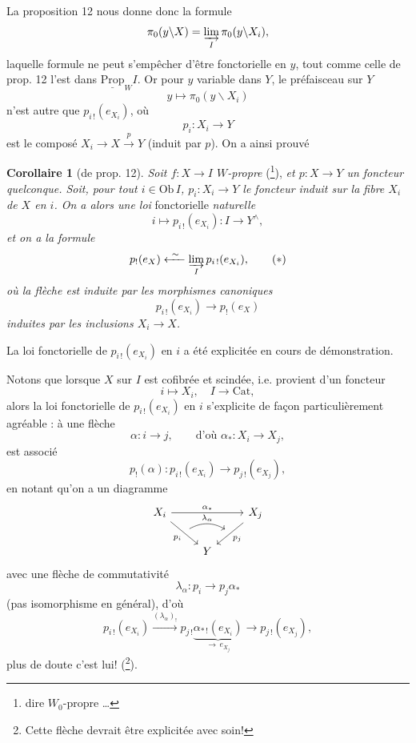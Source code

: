 \documentclass[11pt]{article}
\newcommand{\printedpage}[1]{\marginpar{\footnotesize p.~#1}}
\newcommand{\msp}[1]{\marginpar{\footnotesize [#1]}}
\begin{document}
\msp{page 118}
La proposition 12 nous donne donc la formule
\[
\pi_0(y\backslash X) = \varinjlim_{I} \pi_0(y\backslash X_i),
\]
laquelle formule ne peut s'empêcher d'être fonctorielle en $y$, tout comme celle de prop. 12 l'est dans $\underline{\mathrm{Prop}}_W I$. Or pour $y$ variable dans $Y$, le préfaisceau sur $Y$
\[
y \longmapsto \pi_0(y\backslash X_i)
\]
n'est autre que $p_{i\,!}(e_{X_i})$, où
\[
p_i : X_i \longrightarrow Y
\]
est le composé $X_i \longrightarrow X \xrightarrow{p} Y$ (induit par $p$). On a ainsi prouvé

\textbf{Corollaire 1} (de prop. 12). \textit{Soit $f : X \longrightarrow I$ $W$-propre} (\footnote[82]{dire $W_0$-propre \dots}), \textit{et $p : X \longrightarrow Y$ un foncteur quelconque. Soit, pour tout $i \in \mathrm{Ob}\, I$, $p_i : X_i \longrightarrow Y$ le foncteur induit sur la fibre $X_i$ de $X$ en $i$. On a alors une loi} fonctorielle \textit{naturelle}
\[
i \longmapsto p_{i\,!}(e_{X_i}) : I \longrightarrow Y^\wedge,
\]
\textit{et on a la formule}
\[
p_!(e_X) \xleftarrow{\ \sim\ } \varinjlim_{I} p_{i\,!}(e_{X_i}), \tag*{$(*)$}
\]
\textit{où la flèche est induite par les morphismes canoniques}
\[
p_{i\,!}(e_{X_i}) \longrightarrow p_!(e_X)
\]
\printedpage{81}
\msp{page 119}
\textit{induites par les inclusions $X_i \longrightarrow X$.}

La loi fonctorielle de $p_{i\,!}(e_{X_i})$ en $i$ a été explicitée en cours de démonstration.

Notons que lorsque $X$ sur $I$ est cofibrée et scindée, i.e. provient d'un foncteur
\[
i \longmapsto X_i, \quad I \longrightarrow \mathrm{Cat},
\]
alors la loi fonctorielle de $p_{i\,!}(e_{X_i})$ en $i$ s'explicite de façon particulièrement agréable : à une flèche
\[
\alpha : i \longrightarrow j, \qquad \text{d'où } \alpha_* : X_i \longrightarrow X_j,
\]
est associé
\[
p_!(\alpha) : p_{i\,!}(e_{X_i}) \longrightarrow p_{j\,!}(e_{X_j}),
\]
en notant qu'on a un diagramme
\[
\begin{tikzcd}
X_i \arrow[rr, "\alpha_*"] \arrow[dr, "p_i"', ""{name=A}] & & X_j \arrow[dl, "p_j", ""'{name=B}] \\
& Y &
\arrow[from=A, to=B, bend left, "\lambda_\alpha"] %
\end{tikzcd}
\]
avec une flèche de commutativité
\[
\lambda_\alpha : p_i \longrightarrow p_j\alpha_*
\]
(pas isomorphisme en général), d'où
\[
p_{i\,!}(e_{X_i}) \xrightarrow{(\lambda_\alpha)_!} p_{j\,!}\underbrace{\alpha_{*\,!}(e_{X_i})}_{\longrightarrow\, e_{X_j}} \longrightarrow p_{j\,!}(e_{X_j}),
\]
plus de doute c'est lui! (\footnote[83]{Cette flèche devrait être explicitée avec soin!}).
\end{document}
